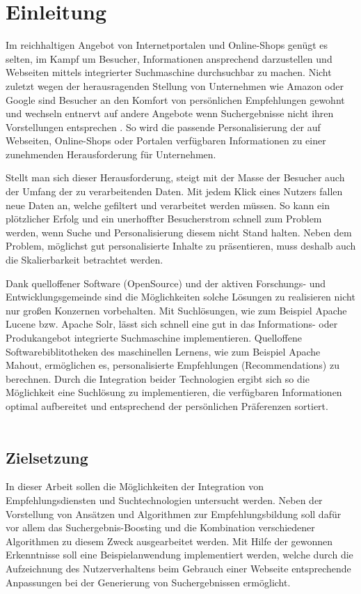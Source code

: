 \section{Einleitung}

Im reichhaltigen Angebot von Internetportalen und Online-Shops genügt es selten, im Kampf um Besucher, Informationen ansprechend darzustellen und Webseiten mittels integrierter Suchmaschine durchsuchbar zu machen. Nicht zuletzt wegen der herausragenden Stellung von Unternehmen wie Amazon oder Google sind Besucher an den Komfort von persönlichen Empfehlungen gewohnt und wechseln entnervt auf andere Angebote wenn Suchergebnisse nicht ihren Vorstellungen entsprechen \citep[Kap. 10]{hb,rs}. So wird die passende Personalisierung der auf Webseiten, Online-Shops oder Portalen verfügbaren Informationen zu einer zunehmenden Herausforderung für Unternehmen.

Stellt man sich dieser Herausforderung, steigt mit der Masse der Besucher auch der Umfang der zu verarbeitenden Daten. Mit jedem Klick eines Nutzers fallen neue Daten an, welche gefiltert und verarbeitet werden müssen. So kann ein plötzlicher Erfolg und ein unerhoffter Besucherstrom schnell zum Problem werden, wenn Suche und Personalisierung diesem nicht Stand halten. Neben dem Problem, möglichst gut personalisierte Inhalte zu präsentieren, muss deshalb auch die Skalierbarkeit betrachtet werden.

Dank quelloffener Software (OpenSource) und der aktiven Forschungs- und Entwicklungsgemeinde sind die Möglichkeiten solche Lösungen zu realisieren nicht nur großen Konzernen vorbehalten. Mit Suchlösungen, wie zum Beispiel Apache Lucene bzw. Apache Solr, lässt sich schnell eine gut in das Informations- oder Produkangebot integrierte Suchmaschine implementieren. Quelloffene Softwarebiblitotheken des maschinellen Lernens, wie zum Beispiel Apache Mahout, ermöglichen es, personalisierte Empfehlungen (Recommendations) zu berechnen. Durch die Integration beider Technologien ergibt sich so die Möglichkeit eine Suchlösung zu implementieren, die verfügbaren Informationen optimal aufbereitet und entsprechend der persönlichen Präferenzen sortiert. \\ \\

\subsection{Zielsetzung}

In dieser Arbeit sollen die Möglichkeiten der Integration von Empfehlungsdiensten und Suchtechnologien untersucht werden. Neben der Vorstellung von Ansätzen und Algorithmen zur Empfehlungsbildung soll dafür vor allem das Suchergebnis-Boosting und die Kombination verschiedener Algorithmen zu diesem Zweck ausgearbeitet werden. Mit Hilfe der gewonnen Erkenntnisse soll eine Beispielanwendung implementiert werden, welche durch die Aufzeichnung des Nutzerverhaltens beim Gebrauch einer Webseite entsprechende Anpassungen bei der Generierung von Suchergebnissen ermöglicht.

